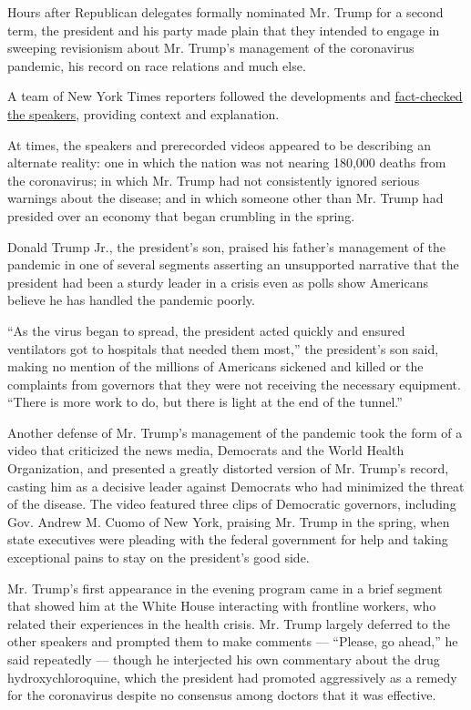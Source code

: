 Hours after Republican delegates formally nominated Mr. Trump for a
second term, the president and his party made plain that they intended
to engage in sweeping revisionism about Mr. Trump's management of the
coronavirus pandemic, his record on race relations and much else.

A team of New York Times reporters followed the developments and
\href{https://www.nytimes3xbfgragh.onion/live/2020/08/24/us/rnc-fact-check}{fact-checked
the speakers}, providing context and explanation.

At times, the speakers and prerecorded videos appeared to be describing
an alternate reality: one in which the nation was not nearing 180,000
deaths from the coronavirus; in which Mr. Trump had not consistently
ignored serious warnings about the disease; and in which someone other
than Mr. Trump had presided over an economy that began crumbling in the
spring.

Donald Trump Jr., the president's son, praised his father's management
of the pandemic in one of several segments asserting an unsupported
narrative that the president had been a sturdy leader in a crisis even
as polls show Americans believe he has handled the pandemic poorly.

``As the virus began to spread, the president acted quickly and ensured
ventilators got to hospitals that needed them most,'' the president's
son said, making no mention of the millions of Americans sickened and
killed or the complaints from governors that they were not receiving the
necessary equipment. ``There is more work to do, but there is light at
the end of the tunnel.''

Another defense of Mr. Trump's management of the pandemic took the form
of a video that criticized the news media, Democrats and the World
Health Organization, and presented a greatly distorted version of Mr.
Trump's record, casting him as a decisive leader against Democrats who
had minimized the threat of the disease. The video featured three clips
of Democratic governors, including Gov. Andrew M. Cuomo of New York,
praising Mr. Trump in the spring, when state executives were pleading
with the federal government for help and taking exceptional pains to
stay on the president's good side.

Mr. Trump's first appearance in the evening program came in a brief
segment that showed him at the White House interacting with frontline
workers, who related their experiences in the health crisis. Mr. Trump
largely deferred to the other speakers and prompted them to make
comments --- ``Please, go ahead,'' he said repeatedly --- though he
interjected his own commentary about the drug hydroxychloroquine, which
the president had promoted aggressively as a remedy for the coronavirus
despite no consensus among doctors that it was effective.

